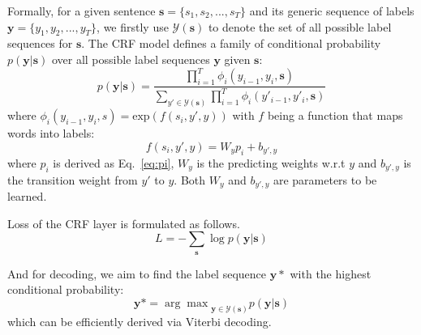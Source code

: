 \documentclass[letterpaper]{article} \usepackage{aaai19}  \usepackage{times}  \usepackage{helvet}  \usepackage{courier}  \usepackage{url}  \usepackage{graphicx}  \usepackage{amsmath}
\begin{document}
Formally, for a given sentence $\bm{s}=\{s_1,s_2,...,s_T\}$ and its generic sequence of labels $\bm{y}=\{y_1,y_2,...,y_T\}$, we firstly use $\mathcal{Y}(\bm{s})$ to denote the set of all possible label sequences for $\bm{s}$. The CRF model defines a family of conditional probability $p(\bm{y}|\bm{s})$ over all possible label sequences $\bm{y}$ given $\bm{s}$:
\begin{equation}
p(\bm{y}|\bm{s})=\frac{\prod_{i=1}^T\phi_i(y_{i-1},y_i,\bm{s})}{\sum_{y'\in \mathcal{Y}(\bm{s})}\prod_{i=1}^T\phi_i(y'_{i-1},y'_i,\bm{s})}
\end{equation}
where $\phi_i(y_{i-1},y_i,s)=\text{exp}(f(s_i, y', y))$ with $f$ being a function that maps words into labels:
\begin{equation}
f(s_i, y', y) = W_{y}p_i+b_{y',y}
\end{equation}
where $p_i$ is derived as Eq.~\ref{eq:pi}, $W_{y}$ is the predicting weights w.r.t $y$ and $b_{y',y}$ is the transition weight from $y'$ to $y$. Both $W_{y}$ and $b_{y',y}$ are parameters to be learned.

Loss of the CRF layer is formulated as follows.\begin{equation}
L=-\sum_{\bm{s}} \log p(\bm{y}|\bm{s})
\end{equation}

And for decoding, we aim to find the label sequence $\bm{y}*$ with the highest conditional probability:
\begin{equation}
\bm{y}*=\mathrm{\arg\max}_{\bm{y}\in \mathcal{Y}(\bm{s})}p(\bm{y}|\bm{s})
\end{equation}
which can be efficiently derived via Viterbi decoding.
\end{document}
